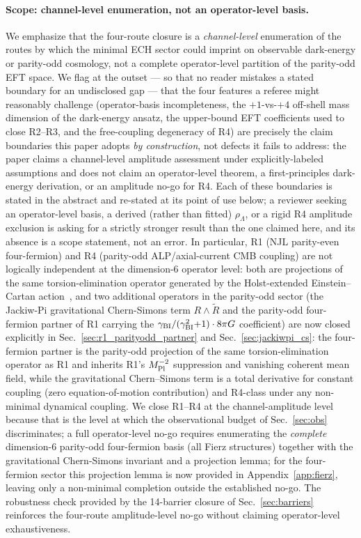 \documentclass[aps,prd,twocolumn,superscriptaddress,showpacs,preprintnumbers,nofootinbib,longbibliography,floatfix]{revtex4-2}
\begin{document}
\paragraph{Scope: channel-level enumeration, not an operator-level basis.}
We emphasize that the four-route closure is a \emph{channel-level} enumeration
of the routes by which the minimal ECH sector could imprint on observable
dark-energy or parity-odd cosmology, not a complete operator-level partition
of the parity-odd EFT space. We flag at the outset --- so that no reader
mistakes a stated boundary for an undisclosed gap --- that the four features
a referee might reasonably challenge (operator-basis incompleteness, the
$+1$-vs-$+4$ off-shell mass dimension of the dark-energy ansatz, the
upper-bound EFT coefficients used to close R2--R3, and the free-coupling
degeneracy of R4) are precisely the claim boundaries this paper adopts
\emph{by construction}, not defects it fails to address: the paper claims a
channel-level amplitude assessment under explicitly-labeled assumptions and
does not claim an operator-level theorem, a first-principles dark-energy
derivation, or an amplitude no-go for R4. Each of these boundaries is stated
in the abstract and re-stated at its point of use below; a reviewer seeking
an operator-level basis, a derived (rather than fitted) $\rho_\Lambda$, or a
rigid R4 amplitude exclusion is asking for a strictly stronger result than
the one claimed here, and its absence is a scope statement, not an error. In particular, R1 (NJL parity-even four-fermion)
and R4 (parity-odd ALP/axial-current CMB coupling) are not logically
independent at the dimension-6 operator level: both are projections of the
same torsion-elimination operator generated by the Holst-extended
Einstein--Cartan action~\cite{Freidel2005,Mercuri2009},
and two additional operators in the parity-odd sector (the Jackiw-Pi gravitational
Chern-Simons term $R \wedge \widetilde R$ and the parity-odd four-fermion
partner of R1 carrying the $\gamma_{\rm BI}/(\gamma_{\rm BI}^2{+}1) \cdot 8\pi G$
coefficient) are now closed explicitly in
Sec.~\ref{sec:r1_parityodd_partner} and Sec.~\ref{sec:jackiwpi_cs}:
the four-fermion partner is the parity-odd projection of the same
torsion-elimination operator as R1 and inherits R1's $M_{\rm Pl}^{-2}$
suppression and vanishing coherent mean field, while the gravitational
Chern--Simons term is a total derivative for constant coupling (zero
equation-of-motion contribution) and R4-class under any non-minimal dynamical
coupling. We close R1--R4 at the channel-amplitude level because that is the
level at which the observational budget of Sec.~\ref{sec:obs} discriminates; a
full operator-level no-go requires enumerating the \emph{complete}
dimension-6 parity-odd four-fermion basis (all Fierz structures) together with
the gravitational Chern-Simons invariant and a projection lemma; for the
four-fermion sector this projection lemma is now provided in
Appendix~\ref{app:fierz}, leaving only a non-minimal completion outside the
established no-go. The robustness check provided by the
14-barrier closure of Sec.~\ref{sec:barriers} reinforces the four-route
amplitude-level no-go without claiming operator-level exhaustiveness.
\end{document}
